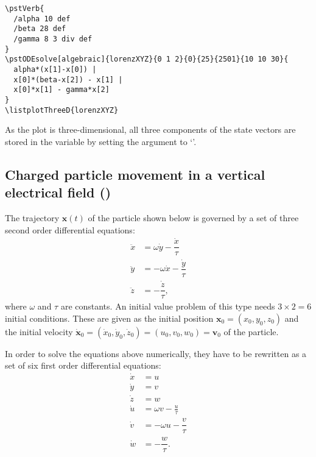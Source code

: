 \documentclass[11pt,english,BCOR10mm,DIV12,bibliography=totoc,parskip=false,smallheadings
    headexclude,footexclude,oneside,dvips,UKenglish]{pst-doc}
\begin{document}
\begin{verbatim}
\pstVerb{
  /alpha 10 def
  /beta 28 def
  /gamma 8 3 div def
}
\pstODEsolve[algebraic]{lorenzXYZ}{0 1 2}{0}{25}{2501}{10 10 30}{
  alpha*(x[1]-x[0]) |
  x[0]*(beta-x[2]) - x[1] |
  x[0]*x[1] - gamma*x[2]
}
\listplotThreeD{lorenzXYZ}
\end{verbatim}
As the plot is three-dimensional, all three components of the state vectors are stored in the \PS{} variable  by setting the  argument to `'.

\subsection[Charged particle movement in a vertical electrical field]{Charged particle movement in a vertical electrical field ()}
The trajectory $\mathbf{x}(t)$ of the particle shown below is governed by a set of three second order differential equations:
\begin{subequations}
\begin{align}
\ddot{x} &= \omega\dot{y}-\dfrac{\dot{x}}{\tau}\\
\ddot{y} &= -\omega\dot{x}-\dfrac{\dot{y}}{\tau}\\
\ddot{z} &= -\dfrac{\dot{z}}{\tau},
\end{align}
\end{subequations}
where $\omega$ and $\tau$ are constants. An initial value problem of this type needs $3\times2=6$ initial conditions. These are given as the initial position $\mathbf{x}_0=(x_0, y_0, z_0)$ and the initial velocity $\dot{\mathbf{x}}_0=(\dot{x}_0, \dot{y}_0, \dot{z}_0)=(u_0, v_0, w_0) = \mathbf{v}_0$ of the particle.

In order to solve the equations above numerically, they have to be rewritten as a set of six first order differential equations:
\begin{subequations}
\begin{align}
\dot{x} &= u\\
\dot{y} &= v\\
\dot{z} &= w\\
\dot{u} &= \omega v-\frac{u}{\tau}\\
\dot{v} &= -\omega u-\dfrac{v}{\tau}\\
\dot{w} &= -\dfrac{w}{\tau}.
\end{align}
\end{subequations}
\end{document}
